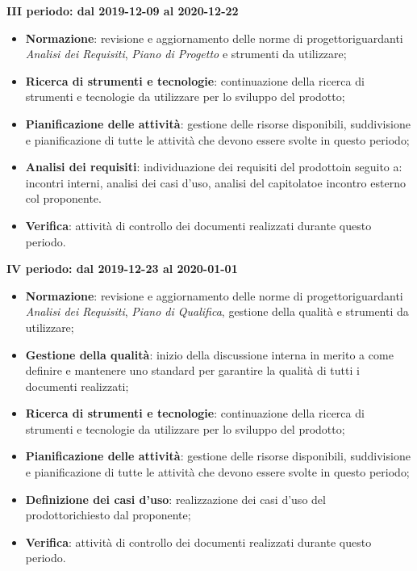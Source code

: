 \textbf{III periodo: dal 2019-12-09 al 2020-12-22}
\begin{itemize}
	\item \textbf{Normazione}: revisione e aggiornamento delle norme di progetto\glosp riguardanti \textit{Analisi dei Requisiti}, \textit{Piano di Progetto} e strumenti da utilizzare;
	\item \textbf{Ricerca di strumenti e tecnologie}: continuazione della ricerca di strumenti e tecnologie da utilizzare per lo sviluppo del prodotto\glo;
	\item \textbf{Pianificazione delle attività}: gestione delle risorse disponibili, suddivisione e pianificazione di tutte le attività che devono essere svolte in questo periodo;
	\item \textbf{Analisi dei requisiti}: individuazione dei requisiti del prodotto\glosp in seguito a: incontri interni, analisi dei casi d'uso, analisi del capitolato\glosp e incontro esterno col proponente.
	\item \textbf{Verifica}: attività di controllo dei documenti realizzati durante questo periodo.
\end{itemize}

\textbf{IV periodo: dal 2019-12-23 al 2020-01-01}
\begin{itemize}
	\item \textbf{Normazione}: revisione e aggiornamento delle norme di progetto\glosp riguardanti \textit{Analisi dei Requisiti}, \textit{Piano di Qualifica}, gestione della qualità e strumenti da utilizzare;
	\item \textbf{Gestione della qualità}: inizio della discussione interna in merito a come definire e mantenere uno standard per garantire la qualità di tutti i documenti realizzati;
	\item \textbf{Ricerca di strumenti e tecnologie}: continuazione della ricerca di strumenti e tecnologie da utilizzare per lo sviluppo del prodotto\glo;
	\item \textbf{Pianificazione delle attività}: gestione delle risorse disponibili, suddivisione e pianificazione di tutte le attività che devono essere svolte in questo periodo;
	\item \textbf{Definizione dei casi d'uso}: realizzazione dei casi d'uso del prodotto\glosp richiesto dal proponente;
	\item \textbf{Verifica}: attività di controllo dei documenti realizzati durante questo periodo.
\end{itemize}



